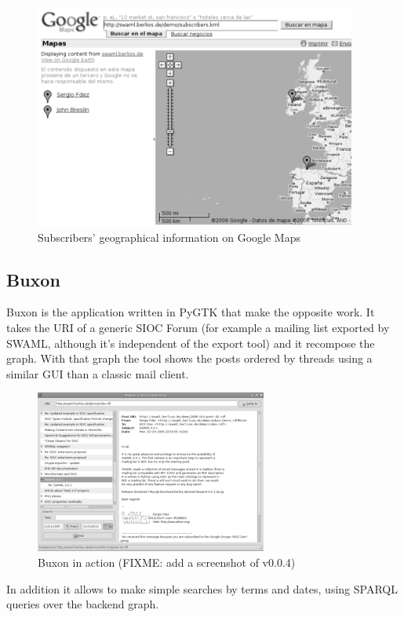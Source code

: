 \documentclass{llncs}
\begin{document}
\begin{figure}[ht]
 \centering
 \includegraphics[bb=0 0 400 280]{images/googlemaps.png}
 \caption{Subscribers' geographical information on Google Maps}
\end{figure}

\subsection{Buxon}

Buxon is the application written in PyGTK that make the opposite work. It 
takes the URI of a generic SIOC Forum (for example a mailing list exported 
by SWAML, although it's independent of the export tool) and it recompose the 
graph. With that graph the tool shows the posts ordered by threads using a 
similar GUI than a classic mail client.

\begin{figure}[ht]
 \centering
 \includegraphics[bb=0 0 288 202]{images/buxon.png}
 \caption{Buxon in action (FIXME: add a screenshot of v0.0.4)}
\end{figure}

In addition it allows to make simple searches by terms and dates, using
SPARQL queries over the backend graph.
\end{document}
